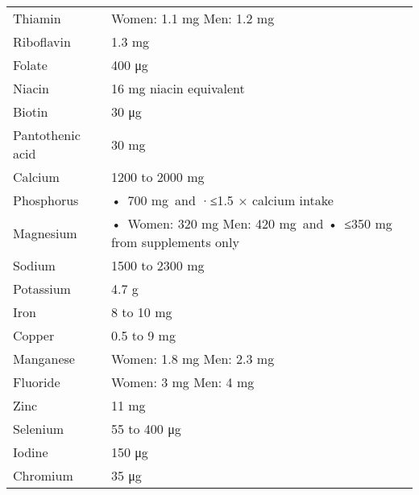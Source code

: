 \begin{longtable}{lp{}}
        Thiamin & Women: 1.1 mg Men: 1.2 mg \\
        Riboflavin & 1.3 mg \\
        Folate & 400 μg \\
        Niacin & 16 mg niacin equivalent \\
        Biotin & 30 μg \\
        Pantothenic acid & 30 mg \\
        Calcium & 1200 to 2000 mg \\
        Phosphorus & • 700 mg and ·≤1.5 × calcium intake \\
        Magnesium & • Women: 320 mg Men: 420 mg and • ≤350 mg from supplements only \\
        Sodium & 1500 to 2300 mg \\
        Potassium & 4.7 g \\
        Iron & 8 to 10 mg \\
        Copper & 0.5 to 9 mg \\
        Manganese & Women: 1.8 mg Men: 2.3 mg \\
        Fluoride & Women: 3 mg Men: 4 mg \\
        Zinc & 11 mg \\
        Selenium & 55 to 400 μg \\
        Iodine & 150 μg \\
        Chromium & 35 μg \\
\end{longtable}

